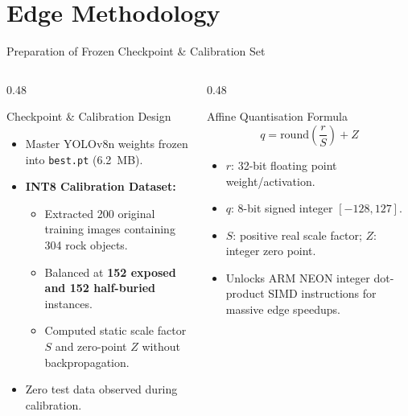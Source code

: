 \documentclass[aspectratio=169,10pt]{beamer}
\begin{document}
\section{Edge Methodology}
\begin{frame}{Preparation of Frozen Checkpoint \& Calibration Set}
\begin{columns}[T]
  \begin{column}{0.48\textwidth}
    \begin{block}{\small Checkpoint \& Calibration Design}
      \small
      \begin{itemize}
        \item Master YOLOv8n weights frozen into \texttt{best.pt} (6.2~MB).
        \item \textbf{INT8 Calibration Dataset:}
        \begin{itemize}
          \item Extracted 200 original training images containing 304 rock objects.
          \item Balanced at \textbf{152 exposed and 152 half-buried} instances.
          \item Computed static scale factor $S$ and zero-point $Z$ without backpropagation.
        \end{itemize}
        \item Zero test data observed during calibration.
      \end{itemize}
    \end{block}
  \end{column}
  \begin{column}{0.48\textwidth}
    \begin{block}{\small Affine Quantisation Formula}
      \small
      \begin{equation*}
        q = \text{round}\left(\frac{r}{S}\right) + Z
      \end{equation*}
      \begin{itemize}
        \item $r$: 32-bit floating point weight/activation.
        \item $q$: 8-bit signed integer $[-128, 127]$.
        \item $S$: positive real scale factor; $Z$: integer zero point.
        \item Unlocks ARM NEON integer dot-product SIMD instructions for massive edge speedups.
      \end{itemize}
    \end{block}
  \end{column}
\end{columns}
\end{frame}
\end{document}
